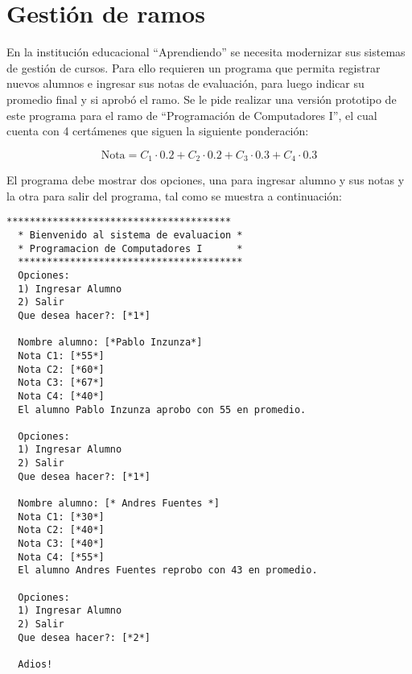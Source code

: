 \section{Gestión de ramos}

  En la institución educacional ``Aprendiendo''
  se necesita modernizar sus sistemas de gestión de cursos.
  Para ello requieren un programa que permita registrar nuevos alumnos
  e ingresar sus notas de evaluación,
  para luego indicar su promedio final y si aprobó el ramo.
  Se le pide realizar una versión prototipo de este programa
  para el ramo de ``Programación de Computadores I'',
  el cual cuenta con 4 certámenes que siguen la siguiente
  ponderación:
  
  \begin{equation*}
  \text{Nota} = 
    C_1 \cdot 0.2 + 
    C_2 \cdot 0.2 +
    C_3 \cdot 0.3 +
    C_4 \cdot 0.3
  \end{equation*}
  
  El programa debe mostrar dos opciones,
  una para ingresar alumno y sus notas
  y la otra para salir del programa,
  tal como se muestra a continuación:
  
  \begin{lstlisting}[style = consola]
  ***************************************
  * Bienvenido al sistema de evaluacion *
  * Programacion de Computadores I      *
  ***************************************
  Opciones:
  1) Ingresar Alumno
  2) Salir
  Que desea hacer?: [*1*]
  
  Nombre alumno: [*Pablo Inzunza*]
  Nota C1: [*55*]
  Nota C2: [*60*]
  Nota C3: [*67*]
  Nota C4: [*40*]
  El alumno Pablo Inzunza aprobo con 55 en promedio.
  
  Opciones:
  1) Ingresar Alumno
  2) Salir
  Que desea hacer?: [*1*]
  
  Nombre alumno: [* Andres Fuentes *]
  Nota C1: [*30*]
  Nota C2: [*40*]
  Nota C3: [*40*]
  Nota C4: [*55*]
  El alumno Andres Fuentes reprobo con 43 en promedio.
  
  Opciones:
  1) Ingresar Alumno
  2) Salir
  Que desea hacer?: [*2*]
  
  Adios!
  \end{lstlisting}
\pagebreak[4]